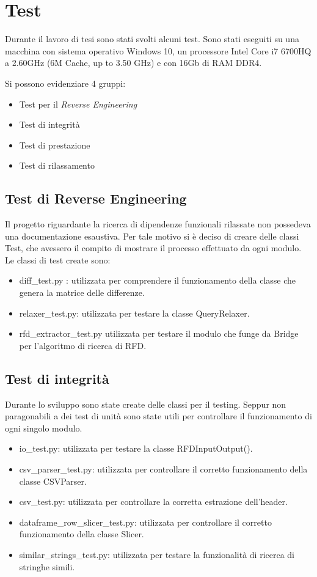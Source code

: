 \section{Test}
Durante il lavoro di tesi sono stati svolti alcuni test. 
Sono stati eseguiti su una macchina con sistema operativo Windows 10, un processore Intel Core i7 6700HQ a 2.60GHz (6M Cache, up to 3.50 GHz) e con 16Gb di RAM DDR4.

Si possono evidenziare 4 gruppi:
\begin{itemize}
    \item Test per il \textit{Reverse Engineering}
    \item Test di integrità 
    \item Test di prestazione
    \item Test di rilassamento
\end{itemize}

\subsection{Test di Reverse Engineering}
Il progetto riguardante la ricerca di dipendenze funzionali rilassate non possedeva una documentazione esaustiva. Per tale motivo si è deciso di creare delle classi Test, che avessero il compito di mostrare il processo effettuato da ogni modulo.
Le classi di test create sono:
\begin{itemize}[noitemsep]
\let\labelitemi\labelitemii
    \item diff{\_}test.py : utilizzata per comprendere il funzionamento della classe che genera la matrice delle differenze.
    \item relaxer{\_}test.py: utilizzata per testare la classe QueryRelaxer.
    \item rfd{\_}extractor{\_}test.py utilizzata per testare il modulo che funge da Bridge per l'algoritmo di ricerca di RFD.
\end{itemize}

\subsection{Test di integrità}
Durante lo sviluppo sono state create delle classi per il testing. Seppur non paragonabili a dei test di unità sono state utili per controllare il funzionamento di ogni singolo modulo.
\begin{itemize}[noitemsep]
\let\labelitemi\labelitemii
    \item io{\_}test.py: utilizzata per testare la classe RFDInputOutput().
    \item csv{\_}parser{\_}test.py: utilizzata per controllare il corretto funzionamento della classe CSVParser. 
    \item csv{\_}test.py: utilizzata per controllare la corretta estrazione dell'header.
    \item dataframe{\_}row{\_}slicer{\_}test.py: utilizzata per controllare il corretto funzionamento della classe Slicer.
    \item similar{\_}strings{\_}test.py: utilizzata per testare la funzionalità di ricerca di stringhe simili.
\end{itemize}
